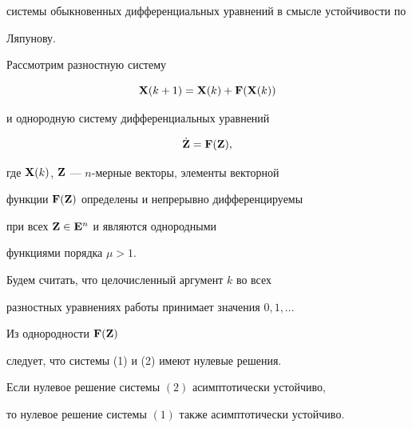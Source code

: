 системы обыкновенных дифференциальных уравнений в смысле устойчивости по


Ляпунову.





Рассмотрим разностную систему


\begin{equation}


\bold X(k+1)=\bold X(k)+\bold F(\bold X(k))


\end{equation}


и однородную систему дифференциальных уравнений


\begin{equation}


\Dot{\bold Z} =\bold F(\bold Z),


\end{equation}


где $\bold X(k)$, $\bold Z$ --- $n$-мерные векторы, элементы векторной


функции $\bold F(\bold Z)$ определены и непрерывно дифференцируемы


при всех $\bold Z\in \bold E^n$ и являются однородными


функциями порядка $\mu>1$.


Будем считать, что целочисленный аргумент $k$ во всех 


разностных уравнениях работы принимает значения $0,1,\dotsc$


Из однородности $\bold F(\bold Z)$


следует, что системы (1) и (2) имеют нулевые решения.





\begin{lem}


Если нулевое решение системы $(2)$ асимптотически устойчиво,


то нулевое решение системы $(1)$ также асимптотически устойчиво.


\end{lem}





